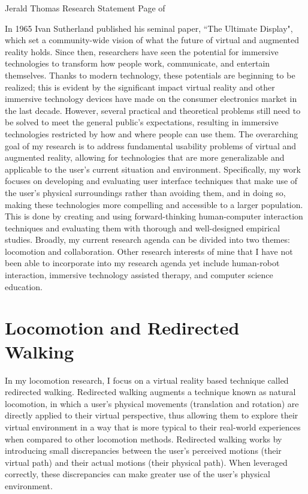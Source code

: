 \newpage

\setcounter{page}{1}
\makecvfooter
  {Jerald Thomas}
  {Research Statement}
  {Page \thepage \hspace{1pt} of \pageref{research_last}}


\makecvheader[C]
\doublespacing


In 1965 Ivan Sutherland published his seminal paper, ``The Ultimate Display", which set a community-wide vision of what the future of virtual and augmented reality holds. Since then, researchers have seen the potential for immersive technologies to transform how people work, communicate, and entertain themselves. Thanks to modern technology, these potentials are beginning to be realized; this is evident by the significant impact virtual reality and other immersive technology devices have made on the consumer electronics market in the last decade. However, several practical and theoretical problems still need to be solved to meet the general public’s expectations, resulting in immersive technologies restricted by how and where people can use them. The overarching goal of my research is to address fundamental usability problems of virtual and augmented reality, allowing for technologies that are more generalizable and applicable to the user's current situation and environment. Specifically, my work focuses on developing and evaluating user interface techniques that make use of the user's physical surroundings rather than avoiding them, and in doing so, making these technologies more compelling and accessible to a larger population. This is done by creating and using forward-thinking human-computer interaction techniques and evaluating them with thorough and well-designed empirical studies. Broadly, my current research agenda can be divided into two themes: locomotion and collaboration. Other research interests of mine that I have not been able to incorporate into my research agenda yet include human-robot interaction, immersive technology assisted therapy, and computer science education.

\section*{Locomotion and Redirected Walking}
\vspace{-0.5cm}
In my locomotion research, I focus on a virtual reality based technique called redirected walking. Redirected walking augments a technique known as natural locomotion, in which a user's physical movements (translation and rotation) are directly applied to their virtual perspective, thus allowing them to explore their virtual environment in a way that is more typical to their real-world experiences when compared to other locomotion methods. Redirected walking works by introducing small discrepancies between the user's perceived motions (their virtual path) and their actual motions (their physical path). When leveraged correctly, these discrepancies can make greater use of the user's physical environment.

